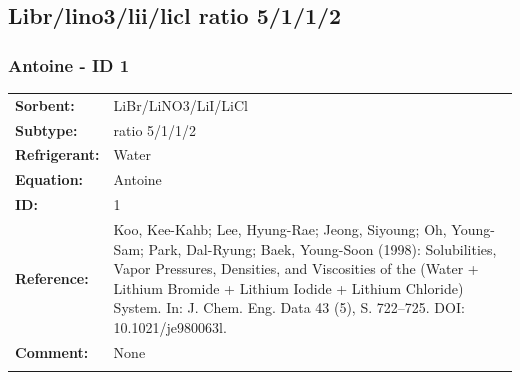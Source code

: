 \subsection{Libr/lino3/lii/licl ratio 5/1/1/2}
%
\subsubsection{Antoine - ID 1}
%
\begin{tabular}[l]{|lp{11.5cm}|}
\hline
\addlinespace

\textbf{Sorbent:} & LiBr/LiNO3/LiI/LiCl \\
\textbf{Subtype:} & ratio 5/1/1/2 \\
\textbf{Refrigerant:} & Water \\
\textbf{Equation:} & Antoine \\
\textbf{ID:} & 1 \\
\textbf{Reference:} & Koo, Kee-Kahb; Lee, Hyung-Rae; Jeong, Siyoung; Oh, Young-Sam; Park, Dal-Ryung; Baek, Young-Soon (1998): Solubilities, Vapor Pressures, Densities, and Viscosities of the (Water + Lithium Bromide + Lithium Iodide + Lithium Chloride) System. In: J. Chem. Eng. Data 43 (5), S. 722–725. DOI: 10.1021/je980063l. \\
\textbf{Comment:} & None \\

\addlinespace
\hline
\end{tabular}
\newline


